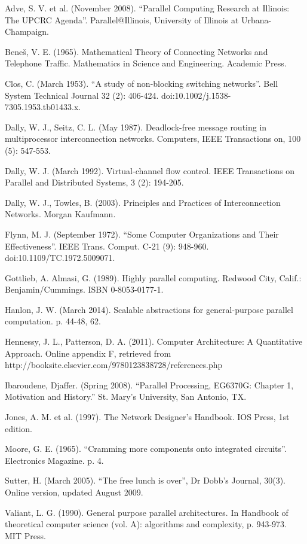 \documentclass[a4paper, 12pt]{article}
\begin{document}
\begin{thebibliography}{30}

 Adve, S. V. et al. (November 2008). “Parallel Computing Research at Illinois: The UPCRC Agenda”. Parallel@Illinois, University of Illinois at Urbana-Champaign.

 Bene\v{s}, V. E. (1965). Mathematical Theory of Connecting Networks and Telephone Traffic. Mathematics in Science and Engineering. Academic Press.

 Clos, C. (March 1953). “A study of non-blocking switching networks”. Bell System Technical Journal 32 (2): 406-424. doi:10.1002/j.1538-7305.1953.tb01433.x.

 Dally, W. J., Seitz, C. L. (May 1987). Deadlock-free message routing in multiprocessor interconnection networks. Computers, IEEE Transactions on, 100 (5): 547-553.

 Dally, W. J. (March 1992). Virtual-channel flow control. IEEE Transactions on Parallel and Distributed Systems, 3 (2): 194-205.

 Dally, W. J., Towles, B. (2003). Principles and Practices of Interconnection Networks. Morgan Kaufmann.

 Flynn, M. J. (September 1972). “Some Computer Organizations and Their Effectiveness”. IEEE Trans. Comput. C-21 (9): 948-960. doi:10.1109/TC.1972.5009071.

 Gottlieb, A. Almasi, G. (1989). Highly parallel computing. Redwood City, Calif.: Benjamin/Cummings. ISBN 0-8053-0177-1.

 Hanlon, J. W. (March 2014). Scalable abstractions for general-purpose parallel computation. p. 44-48, 62.

 Hennessy, J. L., Patterson, D. A. (2011). Computer Architecture: A Quantitative Approach. Online appendix F, retrieved from http://booksite.elsevier.com/9780123838728/references.php

 Ibaroudene, Djaffer. (Spring 2008). “Parallel Processing, EG6370G: Chapter 1, Motivation and History.” St. Mary's University, San Antonio, TX.

 Jones, A. M. et al. (1997). The Network Designer's Handbook. IOS Press, 1st edition.

 Moore, G. E. (1965). “Cramming more components onto integrated circuits”. Electronics Magazine. p. 4.

 Sutter, H. (March 2005). “The free lunch is over”, Dr Dobb's Journal, 30(3). Online version, updated August 2009.

 Valiant, L. G. (1990). General purpose parallel architectures. In Handbook of theoretical computer science (vol. A): algorithms and complexity, p. 943-973. MIT Press.

\end{thebibliography}
\end{document}
